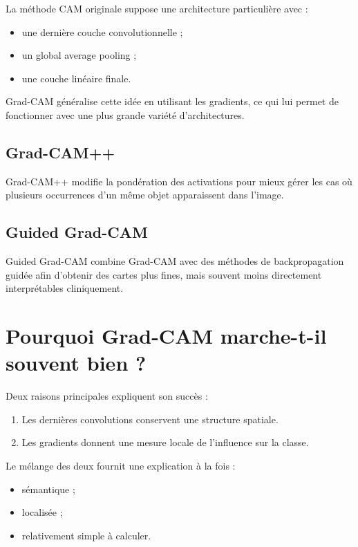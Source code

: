 ﻿\documentclass[11pt,a4paper]{article}
\begin{document}
La méthode CAM originale suppose une architecture particulière avec :
\begin{itemize}
    \item une dernière couche convolutionnelle ;
    \item un global average pooling ;
    \item une couche linéaire finale.
\end{itemize}

Grad-CAM généralise cette idée en utilisant les gradients, ce qui lui permet de fonctionner avec une plus grande variété d'architectures.

\subsection{Grad-CAM++}

Grad-CAM++ modifie la pondération des activations pour mieux gérer les cas où plusieurs occurrences d'un même objet apparaissent dans l'image.

\subsection{Guided Grad-CAM}

Guided Grad-CAM combine Grad-CAM avec des méthodes de backpropagation guidée afin d'obtenir des cartes plus fines, mais souvent moins directement interprétables cliniquement.

\section{Pourquoi Grad-CAM marche-t-il souvent bien ?}

Deux raisons principales expliquent son succès :
\begin{enumerate}[label=\arabic*)]
    \item Les dernières convolutions conservent une structure spatiale.
    \item Les gradients donnent une mesure locale de l'influence sur la classe.
\end{enumerate}

Le mélange des deux fournit une explication à la fois :
\begin{itemize}
    \item sémantique ;
    \item localisée ;
    \item relativement simple à calculer.
\end{itemize}
\end{document}
